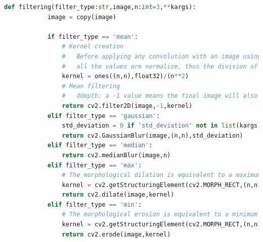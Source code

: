 	\begin{lstlisting}[language=Python]
		def filtering(filter_type:str,image,n:int=3,**kargs):
			image = copy(image)
			
			if filter_type == 'mean':
				# Kernel creation
				#   Before applying any convolution with an image using a 2D matrix it's needed to ensure 
				#   all the values are normalize, thus the division of the matrix
				kernel = ones((n,n),float32)/(n**2)
				# Mean filtering
				#   ddepth: a -1 value means the final image will also have the same depth as the original
				return cv2.filter2D(image,-1,kernel)
			elif filter_type == 'gaussian':
				std_deviation = 0 if 'std_deviation' not in list(kargs) else kargs['std_deviation']
				return cv2.GaussianBlur(image,(n,n),std_deviation)
			elif filter_type == 'median':
				return cv2.medianBlur(image,n)
			elif filter_type == 'max':
				# The morphological dilation is equivalent to a maximum filter
				kernel = cv2.getStructuringElement(cv2.MORPH_RECT,(n,n))
				return cv2.dilate(image,kernel)
			elif filter_type == 'min':
				# The morphological erosion is equivalent to a minimum filter
				kernel = cv2.getStructuringElement(cv2.MORPH_RECT,(n,n))
				return cv2.erode(image,kernel)
	\end{lstlisting}